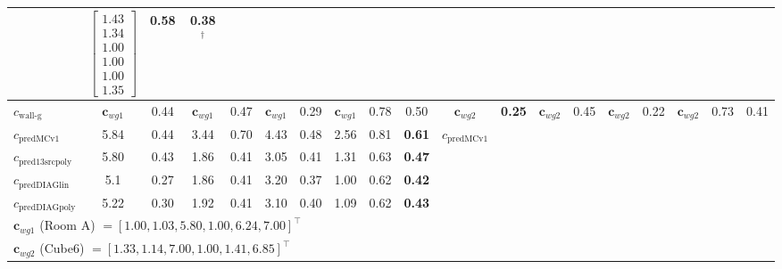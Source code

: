 \documentclass[conference]{IEEEtran}
\begin{document}
\begin{table}[tbh]
\begin{tabular}{l | cc cc cc cc c | cc cc cc cc c}
        & \multicolumn{1}{c}{$\begin{bmatrix} 1.43\\1.34\\1.00\\1.00\\1.00\\1.35 \end{bmatrix}$} & 0.58 & 0.38$^\dagger$ \\[20pt] 
        \midrule

        $c_{\text{wall-g}}$
        & $\mathbf{c}_{wg1}$ & 0.44 & $\mathbf{c}_{wg1}$ & 0.47 & $\mathbf{c}_{wg1}$ & 0.29 & $\mathbf{c}_{wg1}$ & 0.78 & 0.50
        & $\mathbf{c}_{wg2}$ & \textbf{0.25} & $\mathbf{c}_{wg2}$ & 0.45 & $\mathbf{c}_{wg2}$ & 0.22 & $\mathbf{c}_{wg2}$ & 0.73 & 0.41 \\
        \midrule
           $c_{\text{predMCv1}}$
        & 5.84 & 0.44
            & 3.44 & 0.70
              & 4.43 & 0.48
              & 2.56 & 0.81
               & \textbf{0.61}  
        & $c_{\text{predMCv1}}$ & & & & & & & & \\[2pt]

        $c_{\text{pred13srcpoly}}$
        & 5.80 & 0.43 & 1.86 & 0.41 & 3.05 & 0.41 & 1.31 & 0.63 &  \textbf{0.47}  
        &  &  &  &  &  &  &  &  & \\[2pt]

        $c_{\text{predDIAGlin}}$
        & 5.1 & 0.27 & 1.86 & 0.41 & 3.20 & 0.37 & 1.00 & 0.62 &  \textbf{0.42}  
        &  &  &  &  &  &  &  &  & \\[2pt]

        $c_{\text{predDIAGpoly}}$
        & 5.22 & 0.30 & 1.92 & 0.41 & 3.10 & 0.40 & 1.09 & 0.62 &  \textbf{0.43}  
        &  &  &  &  &  &  &  &  & \\[2pt]
        
        \bottomrule
        \multicolumn{19}{l}{\footnotesize  * $\mathbf{c}_{wg1}$ (Room A) $= [1.00, 1.03, 5.80, 1.00, 6.24, 7.00]^\top$} \\
        \multicolumn{19}{l}{\footnotesize  * $\mathbf{c}_{wg2}$ (Cube6) $= [1.33, 1.14, 7.00, 1.00, 1.41, 6.85]^\top$} \\
    \end{tabular}
\end{table}
\end{document}
